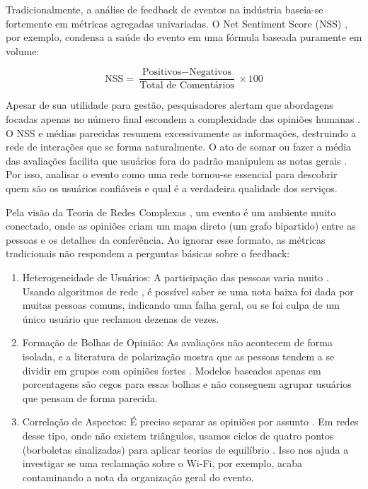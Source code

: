 \documentclass[sigconf]{webmedia}
\begin{document}
Tradicionalmente, a análise de feedback de eventos na indústria baseia-se fortemente em métricas agregadas univariadas. O Net Sentiment Score (NSS) \cite{reichheld, reyes}, por exemplo, condensa a saúde do evento em uma fórmula baseada puramente em volume:

\begin{equation}
\text{NSS} = \frac{\text{Positivos} - \text{Negativos}}{\text{Total de Comentários}} \times 100
\end{equation}

Apesar de sua utilidade para gestão, pesquisadores alertam que abordagens focadas apenas no número final escondem a complexidade das opiniões humanas \cite{liu, taboada}. O NSS e médias parecidas resumem excessivamente as informações, destruindo a rede de interações que se forma naturalmente. O ato de somar ou fazer a média das avaliações facilita que usuários fora do padrão manipulem as notas gerais \cite{akoglu2013, kumar2018}. Por isso, analisar o evento como uma rede tornou-se essencial para descobrir quem são os usuários confiáveis e qual é a verdadeira qualidade dos serviços.

Pela visão da Teoria de Redes Complexas \cite{barabasi, newman}, um evento é um ambiente muito conectado, onde as opiniões criam um mapa direto (um grafo bipartido) entre as pessoas e os detalhes da conferência. Ao ignorar esse formato, as métricas tradicionais não respondem a perguntas básicas sobre o feedback:

\begin{enumerate}
    \item Heterogeneidade de Usuários: A participação das pessoas varia muito \cite{easley}. Usando algoritmos de rede \cite{kumar2018}, é possível saber se uma nota baixa foi dada por muitas pessoas comuns, indicando uma falha geral, ou se foi culpa de um único usuário que reclamou dezenas de vezes.
    \item Formação de Bolhas de Opinião: As avaliações não acontecem de forma isolada, e a literatura de polarização mostra que as pessoas tendem a se dividir em grupos com opiniões fortes \cite{alsinet2023, candellone2024}. Modelos baseados apenas em porcentagens são cegos para essas bolhas e não conseguem agrupar usuários que pensam de forma parecida.
    \item Correlação de Aspectos: É preciso separar as opiniões por assunto \cite{wu}. Em redes desse tipo, onde não existem triângulos, usamos ciclos de quatro pontos (borboletas sinalizadas) para aplicar teorias de equilíbrio \cite{derr2019}. Isso nos ajuda a investigar se uma reclamação sobre o Wi-Fi, por exemplo, acaba contaminando a nota da organização geral do evento.
\end{enumerate}
\end{document}
